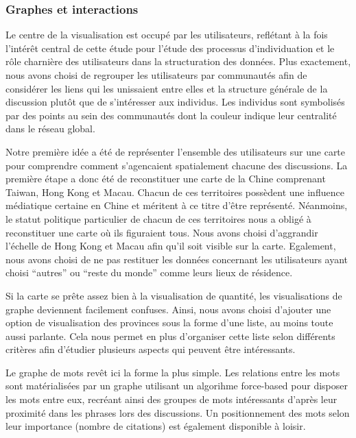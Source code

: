\subsubsection{Graphes et interactions}

Le centre de la visualisation est occupé par les utilisateurs,
reflétant à la fois l{\textquoteright}intér\^et central de cette
étude pour l{\textquoteright}étude des processus
d{\textquoteright}individuation et le r\^ole charnière des
utilisateurs dans la structuration des données. Plus exactement, nous
avons choisi de regrouper les utilisateurs par communautés afin de
considérer les liens qui les unissaient entre elles et la structure
générale de la discussion plut\^ot que de
s{\textquoteright}intéresser aux individus. Les individus sont
symbolisés par des points au sein des communautés dont la couleur
indique leur centralité dans le réseau global. 

Notre première idée a été de représenter
l{\textquoteright}ensemble des utilisateurs sur une carte pour
comprendre comment s{\textquoteright}agencaient spatialement chacune
des discussions. La première étape a donc été de reconstituer
une carte de la Chine comprenant Taiwan, Hong Kong et Macau. Chacun de
ces territoires possèdent une influence médiatique certaine en
Chine et méritent à ce titre d{\textquoteright}\^etre
représenté. Néanmoins, le statut politique particulier de chacun
de ces territoires nous a obligé à reconstituer une carte o\`u ils
figuraient tous. Nous avons choisi d{\textquoteright}aggrandir
l{\textquoteright}échelle de Hong Kong et Macau afin
qu{\textquoteright}il soit visible sur la carte. Egalement, nous avons
choisi de ne pas restituer les données concernant les utilisateurs
ayant choisi {\textquotedblleft}autres{\textquotedblright} ou
{\textquotedblleft}reste du monde{\textquotedblright} comme leurs lieux
de résidence.

Si la carte se pr\^ete assez bien à la visualisation de quantité,
les visualisations de graphe deviennent facilement confuses. Ainsi,
nous avons choisi d{\textquoteright}ajouter une option de visualisation
des provinces sous la forme d{\textquoteright}une liste, au moins toute
aussi parlante. Cela nous permet en plus d{\textquoteright}organiser
cette liste selon différents critères afin
d{\textquoteright}étudier plusieurs aspects qui peuvent \^etre
intéressants.

Le graphe de mots rev\^et ici la forme la plus simple. Les relations
entre les mots sont matérialisées par un graphe utilisant un
algorihme force-based pour disposer les mots entre eux, recréant
ainsi des groupes de mots intéressants d{\textquoteright}après leur
proximité dans les phrases lors des discussions. Un positionnement
des mots selon leur importance (nombre de citations) est également
disponible à loisir.

